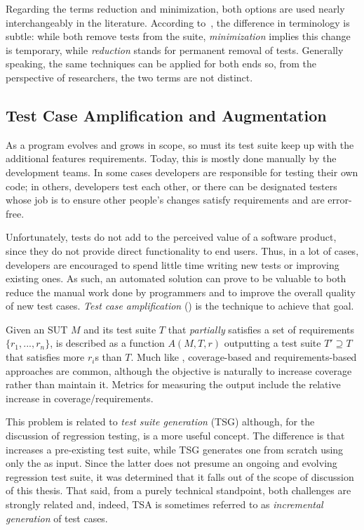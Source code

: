 Regarding the terms reduction and minimization, both options are used nearly interchangeably in the literature.
According to~\citet{yoo2012regression}, the difference in terminology is subtle: while both remove tests from the suite, \textit{minimization} implies this change is temporary, while \textit{reduction} stands for permanent removal of tests.
Generally speaking, the same techniques can be applied for both ends so, from the perspective of researchers, the two terms are not distinct.

\subsection{Test Case Amplification and Augmentation}
\label{sec:tsa}

As a program evolves and grows in scope, so must its test suite keep up with the additional features requirements.
Today, this is mostly done manually by the development teams.
In some cases developers are responsible for testing their own code; in others, developers test each other, or there can be designated testers whose job is to ensure other people's changes satisfy requirements and are error-free.

Unfortunately, tests do not add to the perceived value of a software product, since they do not provide direct functionality to end users.
Thus, in a lot of cases, developers are encouraged to spend little time writing new tests or improving existing ones.
As such, an automated solution can prove to be valuable to both reduce the manual work done by programmers and to improve the overall quality of new test cases.
\textit{Test case amplification} (\tsa) is the technique to achieve that goal.

Given an SUT $M$ and its test suite $T$ that \textit{partially} satisfies a set of requirements $\{r_1, ..., r_n\}$, \tsa is described as a function $A(M, T, r)$ outputting a test suite $T' \supseteq T$ that satisfies more $r_i$s than $T$.
Much like \tsr, coverage-based and requirements-based approaches are common, although the objective is naturally to increase coverage rather than maintain it.
Metrics for measuring the output include the relative increase in coverage/requirements.

This problem is related to \textit{test suite generation} (TSG) although, for the discussion of regression testing, \tsa is a more useful concept.
The difference is that \tsa increases a pre-existing test suite, while TSG generates one from scratch using only the \sut as input.
Since the latter does not presume an ongoing and evolving regression test suite, it was determined that it falls out of the scope of discussion of this thesis.
That said, from a purely technical standpoint, both challenges are strongly related and, indeed, TSA is sometimes referred to as \textit{incremental generation} of test cases.

